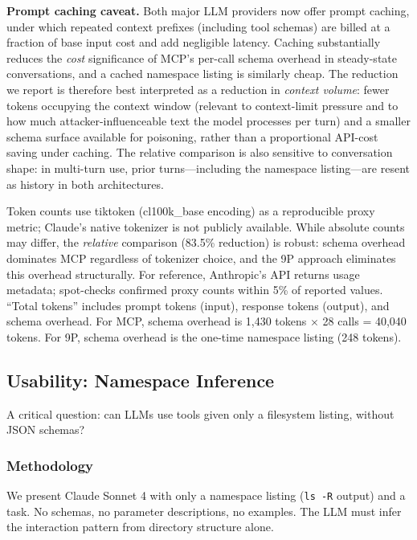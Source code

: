 \documentclass{article}
\begin{document}
\textbf{Prompt caching caveat.} Both major LLM providers now offer prompt caching, under which repeated context prefixes (including tool schemas) are billed at a fraction of base input cost and add negligible latency. Caching substantially reduces the \textit{cost} significance of MCP's per-call schema overhead in steady-state conversations, and a cached namespace listing is similarly cheap. The reduction we report is therefore best interpreted as a reduction in \textit{context volume}: fewer tokens occupying the context window (relevant to context-limit pressure and to how much attacker-influenceable text the model processes per turn) and a smaller schema surface available for poisoning, rather than a proportional API-cost saving under caching. The relative comparison is also sensitive to conversation shape: in multi-turn use, prior turns---including the namespace listing---are resent as history in both architectures.

Token counts use tiktoken (cl100k\_base encoding) as a reproducible proxy metric;
Claude's native tokenizer is not publicly available. While absolute counts may
differ, the \textit{relative} comparison (83.5\% reduction) is robust: schema
overhead dominates MCP regardless of tokenizer choice, and the 9P approach
eliminates this overhead structurally. For reference, Anthropic's API returns
usage metadata; spot-checks confirmed proxy counts within 5\% of reported values.
``Total tokens'' includes prompt tokens (input), response tokens (output), and schema overhead. For MCP, schema overhead is 1,430 tokens $\times$ 28 calls = 40,040 tokens. For 9P, schema overhead is the one-time namespace listing (248 tokens).

\subsection{Usability: Namespace Inference}

A critical question: can LLMs use tools given only a filesystem listing, without JSON schemas?

\subsubsection{Methodology}

We present Claude Sonnet 4 with only a namespace listing (\texttt{ls -R} output) and a task. No schemas, no parameter descriptions, no examples. The LLM must infer the interaction pattern from directory structure alone.
\end{document}
